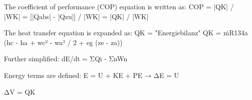 The coefficient of performance (COP) equation is written as:  
COP = |QK| / |WK| = [|Qabs| - |Qzu|] / |WK| = |QK| / |WK|  

The heat transfer equation is expanded as:  
QK = "Energiebilanz"  
QK = ṁR134a (hc - ha + wc² - wa² / 2 + eg (ze - za))  

Further simplified:  
dE/dt = ΣQi - ΣnWn  

Energy terms are defined:  
E = U + KE + PE → ΔE = U  

ΔV = QK